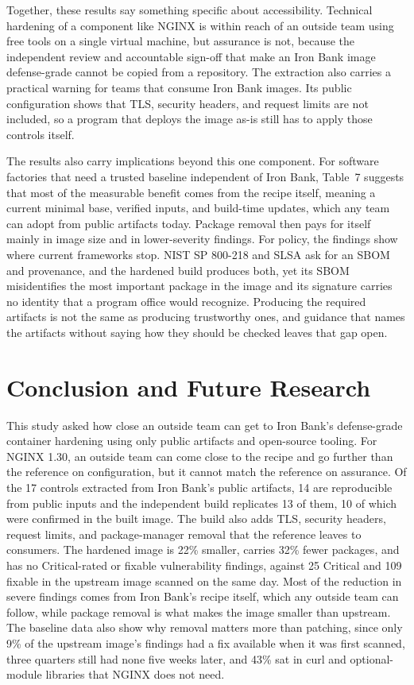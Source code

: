 \documentclass[10pt,letterpaper,twocolumn]{article}
\begin{document}
Together, these results say something specific about accessibility. Technical hardening of a component like NGINX is within reach of an outside team using free tools on a single virtual machine, but assurance is not, because the independent review and accountable sign-off that make an Iron Bank image defense-grade cannot be copied from a repository. The extraction also carries a practical warning for teams that consume Iron Bank images. Its public configuration shows that TLS, security headers, and request limits are not included, so a program that deploys the image as-is still has to apply those controls itself.

The results also carry implications beyond this one component. For software factories that need a trusted baseline independent of Iron Bank, Table~7 suggests that most of the measurable benefit comes from the recipe itself, meaning a current minimal base, verified inputs, and build-time updates, which any team can adopt from public artifacts today. Package removal then pays for itself mainly in image size and in lower-severity findings. For policy, the findings show where current frameworks stop. NIST SP 800-218 and SLSA ask for an SBOM and provenance, and the hardened build produces both, yet its SBOM misidentifies the most important package in the image and its signature carries no identity that a program office would recognize. Producing the required artifacts is not the same as producing trustworthy ones, and guidance that names the artifacts without saying how they should be checked leaves that gap open.

\section{Conclusion and Future Research}

This study asked how close an outside team can get to Iron Bank's defense-grade container hardening using only public artifacts and open-source tooling. For NGINX 1.30, an outside team can come close to the recipe and go further than the reference on configuration, but it cannot match the reference on assurance. Of the 17 controls extracted from Iron Bank's public artifacts, 14 are reproducible from public inputs and the independent build replicates 13 of them, 10 of which were confirmed in the built image. The build also adds TLS, security headers, request limits, and package-manager removal that the reference leaves to consumers. The hardened image is 22\% smaller, carries 32\% fewer packages, and has no Critical-rated or fixable vulnerability findings, against 25 Critical and 109 fixable in the upstream image scanned on the same day. Most of the reduction in severe findings comes from Iron Bank's recipe itself, which any outside team can follow, while package removal is what makes the image smaller than upstream. The baseline data also show why removal matters more than patching, since only 9\% of the upstream image's findings had a fix available when it was first scanned, three quarters still had none five weeks later, and 43\% sat in curl and optional-module libraries that NGINX does not need.
\end{document}
